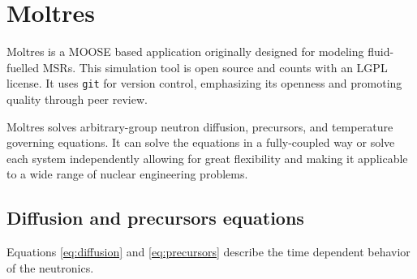 \documentclass[11pt,letterpaper]{article}
\begin{document}
\section{Moltres}

Moltres \cite{lindsay_introduction_2018} is a \gls{MOOSE} based application originally designed for modeling fluid-fuelled \glspl{MSR}.
This simulation tool is open source and counts with an LGPL license.
It uses \texttt{git} for version control, emphasizing its openness and promoting quality through peer review.

Moltres solves arbitrary-group neutron diffusion, precursors, and temperature governing equations.
It can solve the equations in a fully-coupled way or solve each system independently allowing for great flexibility and making it applicable to a wide range of nuclear engineering problems.

\subsection{Diffusion and precursors equations}

Equations \ref{eq:diffusion} and \ref{eq:precursors} describe the time dependent behavior of the neutronics.
\end{document}
